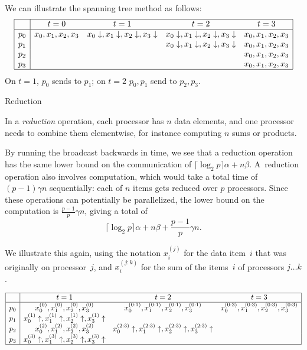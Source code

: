 We can illustrate the spanning tree method as follows:
\[
\begin{array}{|c|cccc|}
\hline
  &t=0&t=1&t=2&t=3\\ \hline
p_0&x_0,x_1,x_2,x_3&x_0\downarrow,x_1\downarrow,x_2\downarrow,x_3\downarrow
   &x_0\downarrow,x_1\downarrow,x_2\downarrow,x_3\downarrow
   &x_0,x_1,x_2,x_3\\
p_1&&&x_0\downarrow,x_1\downarrow,x_2\downarrow,x_3\downarrow
   &x_0,x_1,x_2,x_3\\
p_2&&&&x_0,x_1,x_2,x_3\\
p_3&&&&x_0,x_1,x_2,x_3\\
\hline
\end{array}
\]
On $t=1$, $p_0$ sends to $p_1$; on $t=2$ $p_0,p_1$ send to $p_2,p_3$.


 {Reduction}

In a \emph{reduction} operation, each processor has $n$ data elements, and
one processor needs to combine them elementwise, for instance
computing $n$ sums or products.

By running the broadcast backwards in time, we see that a reduction
operation has the same lower bound on the communication of
$\lceil\log_2 p\rceil \alpha+n\beta$.  A~reduction operation also
involves computation, which would take a total time of $(p-1)\gamma n$
sequentially: each of
$n$ items gets reduced over $p$ processors. Since these operations can
potentially be parallelized, the lower bound on the computation is
$\frac{p-1}p \gamma n$, giving a total of
    \[ \lceil\log_2 p\rceil \alpha+n\beta +\frac{p-1}p \gamma n. \]

We illustrate this again, using the notation $x_i^{(j)}$ for the data item~$i$
that was originally on processor~$j$, and $x_i^{(j:k)}$ for the sum of
the items~$i$ of processors $j\ldots k$.

\[
\begin{array}{|c|ccc|}
\hline
  &t=1&t=2&t=3\\ \hline
p_0&x_0^{(0)},x_1^{(0)},x_2^{(0)},x_3^{(0)}
   &x_0^{(0:1)},x_1^{(0:1)},x_2^{(0:1)},x_3^{(0:1)}
   &x_0^{(0:3)},x_1^{(0:3)},x_2^{(0:3)},x_3^{(0:3)}\\
p_1&x_0^{(1)}\uparrow,x_1^{(1)}\uparrow,x_2^{(1)}\uparrow,x_3^{(1)}\uparrow
   &&\\
p_2&x_0^{(2)},x_1^{(2)},x_2^{(2)},x_3^{(2)}
   &x_0^{(2:3)}\uparrow,x_1^{(2:3)}\uparrow,x_2^{(2:3)}\uparrow,x_3^{(2:3)}\uparrow
   &\\
p_3&x_0^{(3)}\uparrow,x_1^{(3)}\uparrow,x_2^{(3)}\uparrow,x_3^{(3)}\uparrow
   &&\\
\hline
\end{array}
\]

